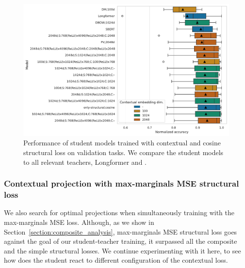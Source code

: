 \begin{figure}

  \includegraphics[width=\textwidth]{img/projections_contextual_cos.pdf}

  \caption{Performance of student models trained with contextual and cosine
  structural loss on validation tasks. We compare the student models to all
  relevant teachers, Longformer and .}

  \label{fig:cos_projections_contextual}

\end{figure}

\subsubsection{Contextual projection with max-marginals MSE structural
loss}\label{section:projections_mm_mse}

We also search for optimal projections when simultaneously training with the
max-marginals MSE loss. Although, as we show in
Section~\ref{section:composite_analysis}, max-marginals MSE structural loss
goes against the goal of our student-teacher training, it surpassed all the
composite and the simple structural losses. We continue experimenting with it
here, to see how does the student react to different configuration of the contextual loss.

